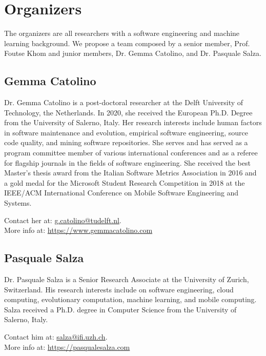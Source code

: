 
\section{Organizers}

The organizers are all researchers with a software engineering and machine learning background.
We propose a team composed by a senior member, \ie Prof. Foutse Khom and junior members, \ie Dr. Gemma Catolino, and Dr. Pasquale Salza.

\label{sec:organizers}
\subsection{Gemma Catolino}
Dr. Gemma Catolino is a post-doctoral researcher at the Delft University of Technology, the Netherlands.
In 2020, she received the European Ph.D. Degree from the University of Salerno, Italy.
Her research interests include human factors in software maintenance and evolution, empirical software engineering, source code quality, and mining software repositories.
She serves and has served as a program committee member of various international conferences and as a referee for flagship journals in the fields of software engineering.
She received the best Master's thesis award from the Italian Software Metrics Association in 2016 and a gold medal for the Microsoft Student Research Competition in 2018 at the IEEE/ACM International Conference on Mobile Software Engineering and Systems.

\medskip
\noindent Contact her at: \href{mailto:g.catolino@tudelft.nl}{g.catolino@tudelft.nl}.\\
More info at: \url{https://www.gemmacatolino.com}


\subsection{Pasquale Salza}
Dr. Pasquale Salza is a Senior Research Associate at the University of Zurich, Switzerland.
His research interests include on software engineering, cloud computing, evolutionary computation, machine learning, and mobile computing.
Salza received a Ph.D. degree in Computer Science from the University of Salerno, Italy.

\medskip
\noindent 
Contact him at: \href{mailto:salza@ifi.uzh.ch}{salza@ifi.uzh.ch}.\\
More info at: \url{https://pasqualesalza.com}

